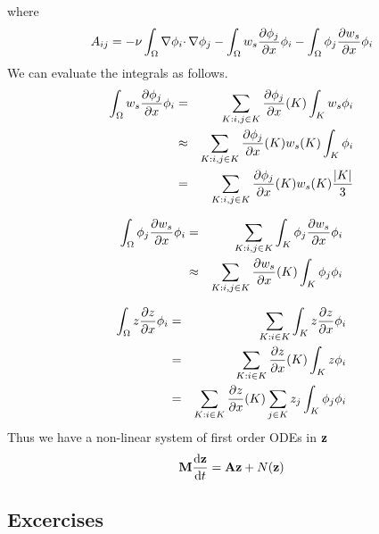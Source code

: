 \documentclass[12pt]{article}
\begin{document}
where
\[
A_{ij} = -\nu \int_\Omega \nabla \phi_i \cdotp \nabla \phi_j - \int_\Omega w_s \frac{\partial \phi_j}{\partial x} \phi_i - \int_\Omega \phi_j \frac{\partial w_s}{\partial x} \phi_i
\]
We can evaluate the integrals as follows.
\begin{eqnarray*}
\int_\Omega w_s \frac{\partial \phi_j}{\partial x} \phi_i &=& \sum_{K : i,j \in K} \frac{\partial \phi_j}{\partial x}(K) \int_K w_s \phi_i \\
&\approx& \sum_{K : i,j \in K} \frac{\partial \phi_j}{\partial x}(K) w_s(K) \int_K \phi_i \\
&=& \sum_{K : i,j \in K} \frac{\partial \phi_j}{\partial x}(K) w_s(K) \frac{|K|}{3}
\end{eqnarray*}

\begin{eqnarray*}
\int_\Omega \phi_j \frac{\partial w_s}{\partial x} \phi_i &=& \sum_{K : i,j \in K} \int_K \phi_j \frac{\partial w_s}{\partial x} \phi_i \\
&\approx& \sum_{K : i,j \in K} \frac{\partial w_s}{\partial x}(K) \int_K \phi_j  \phi_i
\end{eqnarray*}

\begin{eqnarray*}
\int_\Omega z \frac{\partial z}{\partial x} \phi_i &=& \sum_{K : i \in K} \int_K z \frac{\partial z}{\partial x} \phi_i \\
&=& \sum_{K : i \in K} \frac{\partial z}{\partial x}(K) \int_K z \phi_i \\
&=& \sum_{K : i \in K} \frac{\partial z}{\partial x}(K) \sum_{j \in K} z_j \int_K \phi_j \phi_i 
\end{eqnarray*}
Thus we have a non-linear system of first order ODEs in ${\mathbf z}$
\begin{eqnarray*}
 {\mathbf M} \frac{\textrm{d} {\mathbf z}}{\textrm{d} t} = {\mathbf A} {\mathbf z} + N({\mathbf z}) 
\end{eqnarray*}

\subsection{Excercises}




\end{document}
